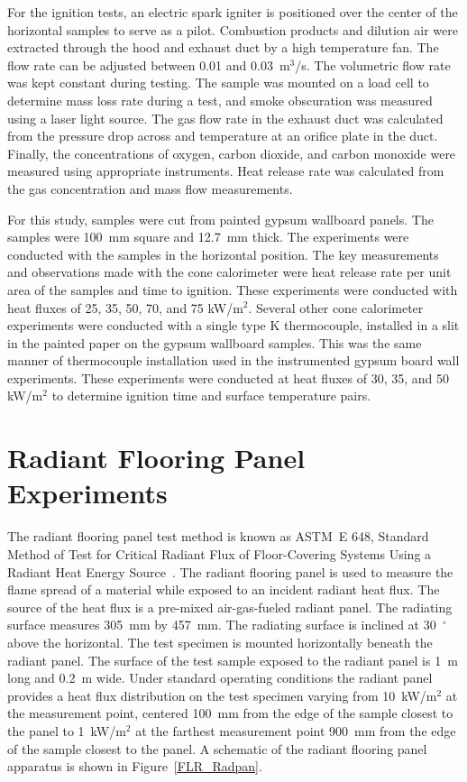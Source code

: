 \documentclass[twoside]{uocthesis}
\begin{document}
{For the ignition tests, an electric spark igniter is positioned over the center of the horizontal samples to serve as a pilot.  Combustion products and dilution air were extracted through the hood and exhaust duct by a high temperature fan. The flow rate can be adjusted between 0.01 and 0.03~m$^3$/s. The volumetric flow rate was kept constant during testing. The sample was mounted on a load cell to determine mass loss rate during a test, and smoke obscuration was measured using a laser light source. The gas flow rate in the exhaust duct was calculated from the pressure drop across and temperature at an orifice plate in the duct. Finally, the concentrations of oxygen, carbon dioxide, and carbon monoxide were measured using appropriate instruments. Heat release rate was calculated from the gas concentration and mass flow measurements.

For this study, samples were cut from painted gypsum wallboard panels. The samples were 100~mm square and 12.7~mm thick. The experiments were conducted with the samples in the horizontal position.  The key measurements and observations made with the cone calorimeter were heat release rate per unit area of the samples and time to ignition. These experiments were conducted with heat fluxes of 25, 35, 50, 70, and 75 kW/m$^2$. Several other cone calorimeter experiments were conducted with a single type K thermocouple, installed in a slit in the painted paper on the gypsum wallboard samples.  This was the same manner of thermocouple installation used in the instrumented gypsum board wall experiments.  These experiments were conducted at heat fluxes of 30, 35, and 50 kW/m$^2$ to determine ignition time and surface temperature pairs.

\section{Radiant Flooring Panel Experiments}

The radiant flooring panel test method is known as ASTM~E 648, Standard Method of Test for Critical Radiant Flux of Floor-Covering Systems Using a Radiant Heat Energy Source~\cite{ASTM_E648}.  The radiant flooring panel is used to measure the flame spread of a material while exposed to an incident radiant heat flux. The source of the heat flux is a pre-mixed air-gas-fueled radiant panel.  The radiating surface measures 305~mm by 457~mm. The radiating surface is inclined at 30~$^{\circ}$ above the horizontal. The test specimen is mounted horizontally beneath the radiant panel.  The surface of the test sample exposed to the radiant panel is 1~m long and 0.2~m wide. Under standard operating conditions the radiant panel provides a heat flux distribution on the test specimen varying from 10~kW/m$^2$ at the measurement point, centered 100~mm from the edge of the sample closest to the panel to 1~kW/m$^2$ at the farthest measurement point 900~mm from the edge of the sample closest to the panel. A schematic of the radiant flooring panel apparatus is shown in Figure~\ref{FLR_Radpan}.  

}
\end{document}
